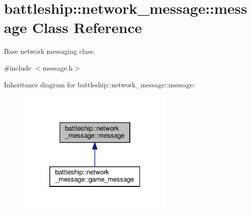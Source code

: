 \hypertarget{classbattleship_1_1network__message_1_1message}{}\section{battleship\+:\+:network\+\_\+message\+:\+:message Class Reference}
\label{classbattleship_1_1network__message_1_1message}


Base network messaging class.  




{\ttfamily \#include $<$message.\+h$>$}



Inheritance diagram for battleship\+:\+:network\+\_\+message\+:\+:message\+:
\nopagebreak
\begin{figure}[H]
\begin{center}
\leavevmode
\includegraphics[width=217pt]{classbattleship_1_1network__message_1_1message__inherit__graph}
\end{center}
\end{figure}
